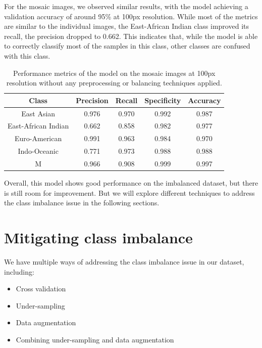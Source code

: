 For the mosaic images, we observed similar results, with the model achieving a validation accuracy of around 95\% at 100px resolution. While most of the metrics
are similar to the individual images, the East-African Indian class improved its recall, the precision dropped to 0.662. This indicates that, while the model is able to
correctly classify most of the samples in this class, other classes are confused with this class.

\begin{table}[H]
	\centering
	\begin{tabular}{|c|c|c|c|c|}
		\hline
		\textbf{Class}      & \textbf{Precision} & \textbf{Recall} & \textbf{Specificity} & \textbf{Accuracy} \\
		\hline
		East Asian          & 0.976              & 0.970           & 0.992                & 0.987             \\
		East-African Indian & 0.662              & 0.858           & 0.982                & 0.977             \\
		Euro-American       & 0.991              & 0.963           & 0.984                & 0.970             \\
		Indo-Oceanic        & 0.771              & 0.973           & 0.988                & 0.988             \\
		M                   & 0.966              & 0.908           & 0.999                & 0.997             \\
		\hline
	\end{tabular}
	\caption{Performance metrics of the model on the mosaic images at 100px resolution without any preprocessing or balancing techniques applied.}
	\label{tab:performance_metrics_mosaic_std}
\end{table}

Overall, this model shows good performance on the imbalanced dataset, but there is still room for improvement. But we will explore different techniques
to address the class imbalance issue in the following sections.

\section{Mitigating class imbalance}
\label{sec:mitigating_class_imbalance}

We have multiple ways of addressing the class imbalance issue in our dataset, including:

\begin{itemize}
	\item Cross validation
	\item Under-sampling
	\item Data augmentation
	\item Combining under-sampling and data augmentation
\end{itemize}

